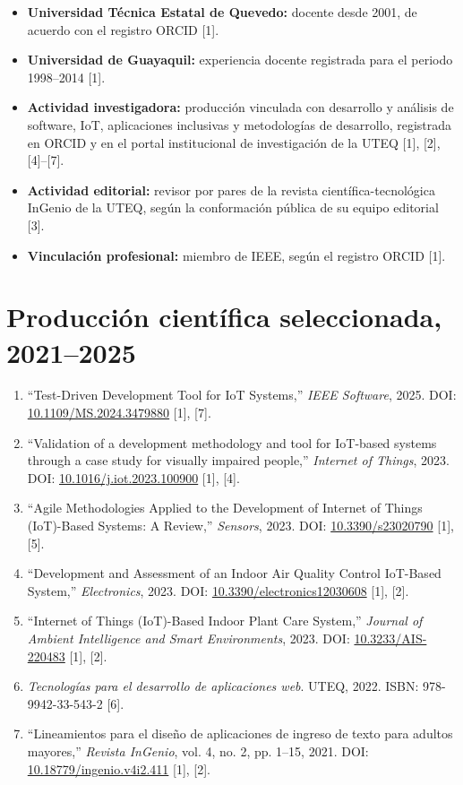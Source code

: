 \documentclass[10pt,a4paper]{article}
\begin{document}
\begin{itemize}
  \item \textbf{Universidad Técnica Estatal de Quevedo:} docente desde 2001, de acuerdo con el registro ORCID [1].
  \item \textbf{Universidad de Guayaquil:} experiencia docente registrada para el periodo 1998--2014 [1].
  \item \textbf{Actividad investigadora:} producción vinculada con desarrollo y análisis de software, IoT, aplicaciones inclusivas y metodologías de desarrollo, registrada en ORCID y en el portal institucional de investigación de la UTEQ [1], [2], [4]--[7].
  \item \textbf{Actividad editorial:} revisor por pares de la revista científica-tecnológica InGenio de la UTEQ, según la conformación pública de su equipo editorial [3].
  \item \textbf{Vinculación profesional:} miembro de IEEE, según el registro ORCID [1].
\end{itemize}

\section{Producción científica seleccionada, 2021--2025}

\small
\begin{enumerate}[label={\textbf{P\arabic*.}}]
  \item ``Test-Driven Development Tool for IoT Systems,'' \emph{IEEE Software}, 2025. DOI: \href{https://doi.org/10.1109/MS.2024.3479880}{10.1109/MS.2024.3479880} [1], [7].
  \item ``Validation of a development methodology and tool for IoT-based systems through a case study for visually impaired people,'' \emph{Internet of Things}, 2023. DOI: \href{https://doi.org/10.1016/j.iot.2023.100900}{10.1016/j.iot.2023.100900} [1], [4].
  \item ``Agile Methodologies Applied to the Development of Internet of Things (IoT)-Based Systems: A Review,'' \emph{Sensors}, 2023. DOI: \href{https://doi.org/10.3390/s23020790}{10.3390/s23020790} [1], [5].
  \item ``Development and Assessment of an Indoor Air Quality Control IoT-Based System,'' \emph{Electronics}, 2023. DOI: \href{https://doi.org/10.3390/electronics12030608}{10.3390/electronics12030608} [1], [2].
  \item ``Internet of Things (IoT)-Based Indoor Plant Care System,'' \emph{Journal of Ambient Intelligence and Smart Environments}, 2023. DOI: \href{https://doi.org/10.3233/AIS-220483}{10.3233/AIS-220483} [1], [2].
  \item \emph{Tecnologías para el desarrollo de aplicaciones web}. UTEQ, 2022. ISBN: 978-9942-33-543-2 [6].
  \item ``Lineamientos para el diseño de aplicaciones de ingreso de texto para adultos mayores,'' \emph{Revista InGenio}, vol. 4, no. 2, pp. 1--15, 2021. DOI: \href{https://doi.org/10.18779/ingenio.v4i2.411}{10.18779/ingenio.v4i2.411} [1], [2].
\end{enumerate}
\normalsize
\end{document}

